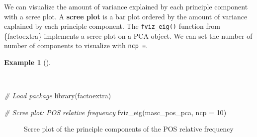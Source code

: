 \documentclass[
  letterpaper,
]{latex/krantz}
\newenvironment{Shaded}{\begin{snugshade}}{\end{snugshade}}
\newcommand{\AttributeTok}[1]{\textcolor[rgb]{0.00,0.00,0.00}{#1}}
\newcommand{\CommentTok}[1]{\textcolor[rgb]{0.00,0.00,0.00}{\textit{#1}}}
\newcommand{\DecValTok}[1]{\textcolor[rgb]{0.00,0.00,0.00}{#1}}
\newcommand{\FunctionTok}[1]{\textcolor[rgb]{0.00,0.00,0.00}{#1}}
\newcommand{\NormalTok}[1]{\textcolor[rgb]{0.00,0.00,0.00}{#1}}
\theoremstyle{definition}
\newtheorem{example}{Example}[chapter]
\theoremstyle{remark}
\begin{document}
We can visualize the amount of variance explained by each principle
component with a scree plot. A \textbf{scree plot} is a bar plot ordered
by the amount of variance explained by each principle component. The
\texttt{fviz\_eig()} function from \{factoextra\} implements a scree
plot on a PCA object. We can set the number of number of components to
visualize with \texttt{ncp\ =}.

\begin{example}[]\protect\hypertarget{exm-explore-masc-dtms-pca-scree}{}\label{exm-explore-masc-dtms-pca-scree}

~

\begin{Shaded}
\begin{Highlighting}[]
\CommentTok{\# Load package}
\FunctionTok{library}\NormalTok{(factoextra)}

\CommentTok{\# Scree plot: POS relative frequency}
\FunctionTok{fviz\_eig}\NormalTok{(masc\_pos\_pca, }\AttributeTok{ncp =} \DecValTok{10}\NormalTok{)}
\end{Highlighting}
\end{Shaded}

\begin{figure}[!htb]


\caption{\label{fig-explore-masc-dtms-pca-scree}Scree plot of the
principle components of the POS relative frequency}

\end{figure}%

\end{example}
\end{document}
